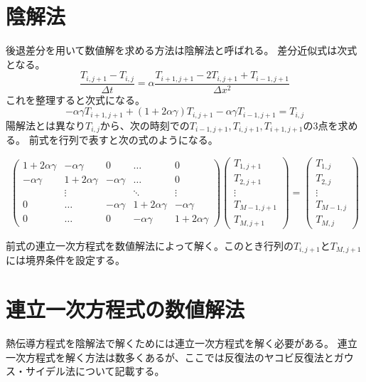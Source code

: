 \documentclass{ujarticle}
\begin{document}
\section{陰解法}
後退差分を用いて数値解を求める方法は陰解法と呼ばれる。
差分近似式は次式となる。
\begin{equation}
\frac{T_{i,j+1}-T_{i,j}}{\Delta t} = \alpha \frac{T_{i+1,j+1}-2T_{i,j+1}+T_{i-1,j+1}}{\Delta x^2}
\end{equation}
これを整理すると次式になる。
\begin{equation}
-\alpha \gamma T_{i+1,j+1}+(1+2 \alpha \gamma)T_{i,j+1} - \alpha \gamma T_{i-1,j+1} = T_{i,j}
\end{equation}
陽解法とは異なり$T_{i,j}$から、次の時刻での$T_{i-1,j+1},T_{i,j+1},T_{i+1,j+1}$の3点を求める。
前式を行列で表すと次の式のようになる。

\[
  \left(
    \begin{array}{ccccc}
      1+2 \alpha \gamma & -\alpha \gamma  & 0 & \ldots & 0 \\
      -\alpha \gamma  & 1+2 \alpha \gamma & -\alpha \gamma & \ldots & 0 \\
       & \vdots &  & \ddots & \vdots \\
      0 & \ldots & -\alpha \gamma  & 1+2 \alpha \gamma & -\alpha \gamma \\
      0 & \ldots & 0 &  -\alpha \gamma  & 1+2 \alpha \gamma
    \end{array}
  \right)
  \left(
  	\begin{array}{c}
  		T_{1,j+1} \\ T_{2,j+1} \\ \vdots \\ T_{M-1,j+1} \\ T_{M,j+1} 
  	\end{array}
  \right)
  =
  \left(
  	\begin{array}{c}
 		T_{1,j} \\ T_{2,j} \\ \vdots \\ T_{M-1,j} \\ T_{M,j} 
  	\end{array}
  \right)
\]

前式の連立一次方程式を数値解法によって解く。このとき行列の$T_{i,j+1}$と$T_{M,j+1}$には境界条件を設定する。

\section{連立一次方程式の数値解法}
熱伝導方程式を陰解法で解くためには連立一次方程式を解く必要がある。
連立一次方程式を解く方法は数多くあるが、ここでは反復法のヤコビ反復法とガウス・サイデル法について記載する。
\end{document}
